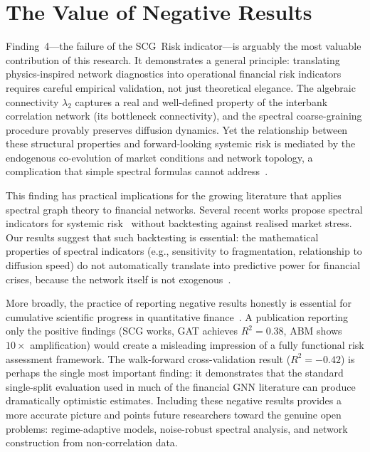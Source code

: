 \section{The Value of Negative Results}
\label{sec:negative}

Finding~4---the failure of the SCG~Risk indicator---is arguably the most valuable contribution of this research. It demonstrates a general principle: translating physics-inspired network diagnostics into operational financial risk indicators requires careful empirical validation, not just theoretical elegance. The algebraic connectivity $\lambda_2$ captures a real and well-defined property of the interbank correlation network (its bottleneck connectivity), and the spectral coarse-graining procedure provably preserves diffusion dynamics. Yet the relationship between these structural properties and forward-looking systemic risk is mediated by the endogenous co-evolution of market conditions and network topology, a complication that simple spectral formulas cannot address~\cite{bardoscia2021physics,caccioli2018network}.

This finding has practical implications for the growing literature that applies spectral graph theory to financial networks. Several recent works propose spectral indicators for systemic risk~\cite{haldane2011systemic,battiston2016price,estrada2015first} without backtesting against realised market stress. Our results suggest that such backtesting is essential: the mathematical properties of spectral indicators (e.g., sensitivity to fragmentation, relationship to diffusion speed) do not automatically translate into predictive power for financial crises, because the network itself is not exogenous~\cite{elliott2014financial,acemoglu2015systemic}.

More broadly, the practice of reporting negative results honestly is essential for cumulative scientific progress in quantitative finance~\cite{bisias2012survey}. A publication reporting only the positive findings (SCG works, GAT achieves $R^2 = 0.38$, ABM shows $10\times$ amplification) would create a misleading impression of a fully functional risk assessment framework. The walk-forward cross-validation result ($R^2 = -0.42$) is perhaps the single most important finding: it demonstrates that the standard single-split evaluation used in much of the financial GNN literature can produce dramatically optimistic estimates. Including these negative results provides a more accurate picture and points future researchers toward the genuine open problems: regime-adaptive models, noise-robust spectral analysis, and network construction from non-correlation data.


